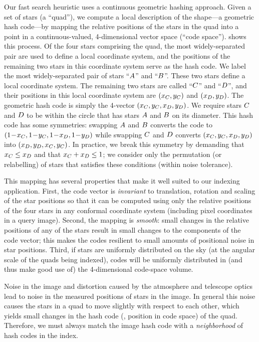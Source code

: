 Our fast search heuristic uses a continuous geometric hashing
approach.  Given a set of stars (a ``quad''), we compute a local
description of the shape---a geometric hash code---by mapping the
relative positions of the stars in the quad into a point in a
continuous-valued, 4-dimensional vector space (``code space'').
 shows this process.  Of the four stars comprising
the quad, the most widely-separated pair are used to define a local
coordinate system, and the positions of the remaining two stars in
this coordinate system serve as the hash code.  We label the most
widely-separated pair of stars ``$A$'' and ``$B$''.  These
two stars define a local coordinate system.  The remaining two stars
are called ``$C$'' and ``$D$'', and their positions in this
local coordinate system are $(x_{C},y_{C})$ and $(x_{D},y_{D})$.  The
geometric hash code is simply the 4-vector \mbox{$(x_{C},y_{C},x_{D},y_{D})$}.
We require stars $C$ and $D$ to be within the circle that
has stars $A$ and $B$ on its diameter.  This hash code has
some symmetries: swapping $A$ and $B$ converts the code to
\mbox{$(1\!-\!\xC,1\!-\!\yC,1\!-\!\xD,1\!-\!\yD)$} while swapping
$C$ and $D$ converts \mbox{$(x_{C},y_{C},x_{D},y_{D})$} into
\mbox{$(x_{D},y_{D},x_{C},y_{C})$.}  In practice, we break this symmetry by
demanding that \mbox{$x_{C} \le x_{D}$} and that \mbox{$x_{C} + x_{D} \le 1$;}
we consider only the permutation (or relabelling) of stars that
satisfies these conditions (within noise tolerance).


This mapping has several properties that make it well suited to our
indexing application. First, the code vector is \emph{invariant} to
translation, rotation and scaling of the star positions so that it can
be computed using only the relative positions of the four stars in any
conformal coordinate system (including pixel coordinates in a query
image).  Second, the mapping is \emph{smooth}: small changes in the
relative positions of any of the stars result in small changes to the
components of the code vector; this makes the codes resilient to small
amounts of positional noise in star positions.  Third, if stars are
uniformly distributed on the sky (at the angular scale of the quads
being indexed), codes will be uniformly distributed in (and thus make
good use of) the 4-dimensional code-space volume.


Noise in the image and distortion caused by the atmosphere and
telescope optics lead to noise in the measured positions of stars in
the image.  In general this noise causes the stars in a quad to move
slightly with respect to each other, which yields small changes in the
hash code (\ie, position in code space) of the quad.  Therefore, we
must always match the image hash code with a \emph{neighborhood} of
hash codes in the index.


